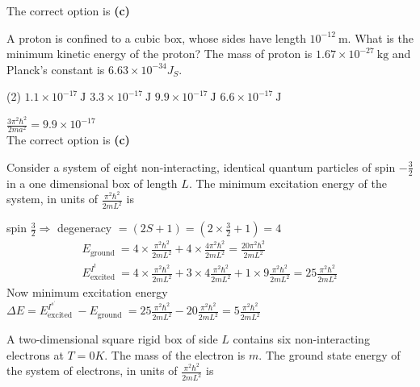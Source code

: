 \begin{enumerate}
\begin{answer}
		The correct option is \textbf{(c)}
	\end{answer}
	\begin{minipage}{\textwidth}
		\item A proton is confined to a cubic box, whose sides have length $10^{-12} \mathrm{~m}$. What is the minimum kinetic energy of the proton? The mass of proton is $1.67 \times 10^{-27} \mathrm{~kg}$ and Planck's constant is $6.63 \times 10^{-34} J_{S}$.
	\end{minipage}
	\begin{tasks}(2)
		\task[\textbf{A.}] $1.1 \times 10^{-17} \mathrm{~J}$
		\task[\textbf{B.}] $3.3 \times 10^{-17} \mathrm{~J}$
		\task[\textbf{C.}]$9.9 \times 10^{-17} \mathrm{~J}$
		\task[\textbf{D.}]$6.6 \times 10^{-17} \mathrm{~J}$
	\end{tasks}
	\begin{answer}
		$\frac{3 \pi^{2} \hbar^{2}}{2 m a^{2}}=9.9 \times 10^{-17}$\\
		The correct option is \textbf{(c)}	
	\end{answer}
	\begin{minipage}{\textwidth}
		\item Consider a system of eight non-interacting, identical quantum particles of spin $-\frac{3}{2}$ in a one dimensional box of length $L$. The minimum excitation energy of the system, in units of $\frac{\pi^{2} \hbar^{2}}{2 m L^{2}}$ is
	\end{minipage}
	\begin{answer}
		spin $\frac{3}{2} \Rightarrow$ degeneracy $=(2 S+1)=\left(2 \times \frac{3}{2}+1\right)=4$
		$$
		\begin{gathered}
		E_{\text {ground }}=4 \times \frac{\pi^{2} \hbar^{2}}{2 m L^{2}}+4 \times \frac{4 \pi^{2} \hbar^{2}}{2 m L^{2}}=\frac{20 \pi^{2} \hbar^{2}}{2 m L^{2}} \\
		E_{\text {excited }}^{I^{t}}=4 \times \frac{\pi^{2} \hbar^{2}}{2 m L^{2}}+3 \times 4 \frac{\pi^{2} \hbar^{2}}{2 m L^{2}}+1 \times 9 \frac{\pi^{2} \hbar^{2}}{2 m L^{2}}=25 \frac{\pi^{2} \hbar^{2}}{2 m L^{2}}
		\end{gathered}
		$$
		Now minimum excitation energy $\Delta E=E_{\text {excited }}^{I^{s^{\prime}}}-E_{\text {ground }}=25 \frac{\pi^{2} \hbar^{2}}{2 m L^{2}}-20 \frac{\pi^{2} \hbar^{2}}{2 m L^{2}}=5 \frac{\pi^{2} \hbar^{2}}{2 m L^{2}}$	
	\end{answer}
	\begin{minipage}{\textwidth}
		\item A two-dimensional square rigid box of side $L$ contains six non-interacting electrons at $T=0 K .$ The mass of the electron is $m .$ The ground state energy of the system of electrons, in units of $\frac{\pi^{2} \hbar^{2}}{2 m L^{2}}$ is

\end{minipage}
\end{enumerate}

